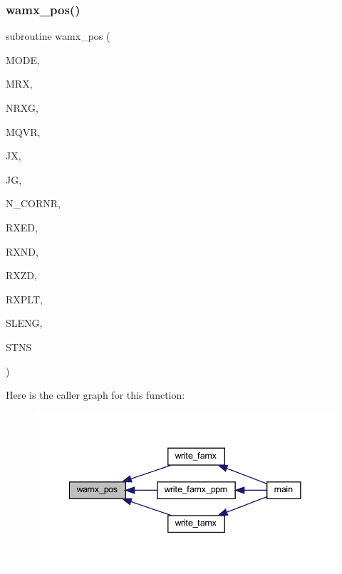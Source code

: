 \subsubsection{\texorpdfstring{wamx\+\_\+pos()}{wamx\_pos()}}
{\footnotesize\ttfamily subroutine wamx\+\_\+pos (\begin{DoxyParamCaption}\item[{integer, intent(in)}]{M\+O\+DE,  }\item[{integer, intent(in)}]{M\+RX,  }\item[{integer, intent(in)}]{N\+R\+XG,  }\item[{integer, intent(in)}]{M\+Q\+VR,  }\item[{integer, intent(in)}]{JX,  }\item[{integer, intent(in)}]{JG,  }\item[{integer, intent(in)}]{N\+\_\+\+C\+O\+R\+NR,  }\item[{real (kind = dp), dimension(mrx, nrxg, mqvr), intent(in)}]{R\+X\+ED,  }\item[{real (kind = dp), dimension(mrx, nrxg, mqvr), intent(in)}]{R\+X\+ND,  }\item[{real (kind = dp), dimension(mrx, nrxg, mqvr), intent(in)}]{R\+X\+ZD,  }\item[{real (kind = dp), dimension(max\+\_\+comp, jx), intent(inout)}]{R\+X\+P\+LT,  }\item[{real (kind = dp), dimension(jx), intent(inout)}]{S\+L\+E\+NG,  }\item[{integer, intent(out)}]{S\+T\+NS }\end{DoxyParamCaption})}

Here is the caller graph for this function\+:
\nopagebreak
\begin{figure}[H]
\begin{center}
\leavevmode
\includegraphics[width=341pt]{Marco_8f90_a1004d10c3bda42643945bbc256f4824f_icgraph}
\end{center}
\end{figure}
\mbox{\label{Marco_8f90_a2bc01734a74feed58986986ff793df0b}} 
